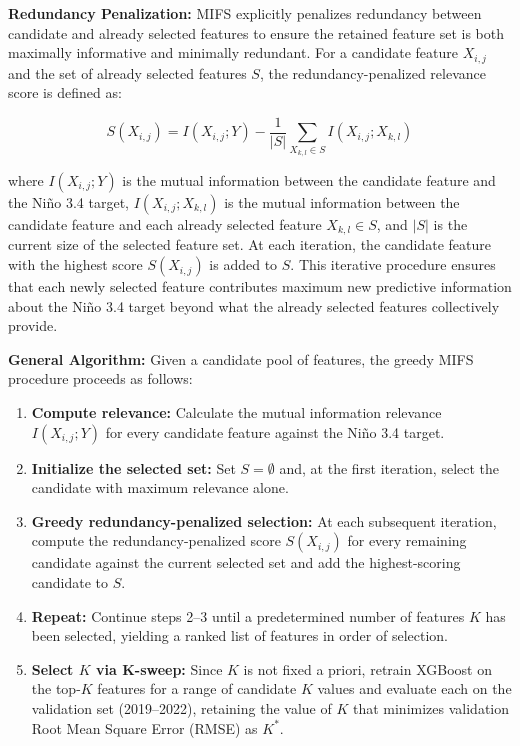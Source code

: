 \textbf{Redundancy Penalization:} MIFS explicitly penalizes redundancy between candidate and already selected features to ensure the retained feature set is both maximally informative and minimally redundant. For a candidate feature $X_{i,j}$ and the set of already selected features $S$, the redundancy-penalized relevance score is defined as:

\begin{equation}
S(X_{i,j}) = I(X_{i,j}; Y) - \frac{1}{|S|} \sum_{X_{k,l} \in S} I(X_{i,j}; X_{k,l})
\end{equation}

\noindent where $I(X_{i,j}; Y)$ is the mutual information between the candidate feature and the Ni\~{n}o 3.4 target, $I(X_{i,j}; X_{k,l})$ is the mutual information between the candidate feature and each already selected feature $X_{k,l} \in S$, and $|S|$ is the current size of the selected feature set. At each iteration, the candidate feature with the highest score $S(X_{i,j})$ is added to $S$. This iterative procedure ensures that each newly selected feature contributes maximum new predictive information about the Ni\~{n}o 3.4 target beyond what the already selected features collectively provide.

\textbf{General Algorithm:} Given a candidate pool of features, the greedy MIFS procedure proceeds as follows:

\begin{enumerate}
    \item \textbf{Compute relevance:} Calculate the mutual information relevance $I(X_{i,j}; Y)$ for every candidate feature against the Ni\~{n}o 3.4 target.
    \item \textbf{Initialize the selected set:} Set $S = \emptyset$ and, at the first iteration, select the candidate with maximum relevance alone.
    \item \textbf{Greedy redundancy-penalized selection:} At each subsequent iteration, compute the redundancy-penalized score $S(X_{i,j})$ for every remaining candidate against the current selected set and add the highest-scoring candidate to $S$.
    \item \textbf{Repeat:} Continue steps 2--3 until a predetermined number of features $K$ has been selected, yielding a ranked list of features in order of selection.
    \item \textbf{Select $K$ via K-sweep:} Since $K$ is not fixed a priori, retrain XGBoost on the top-$K$ features for a range of candidate $K$ values and evaluate each on the validation set (2019--2022), retaining the value of $K$ that minimizes validation Root Mean Square Error (RMSE) as $K^*$.
\end{enumerate}

